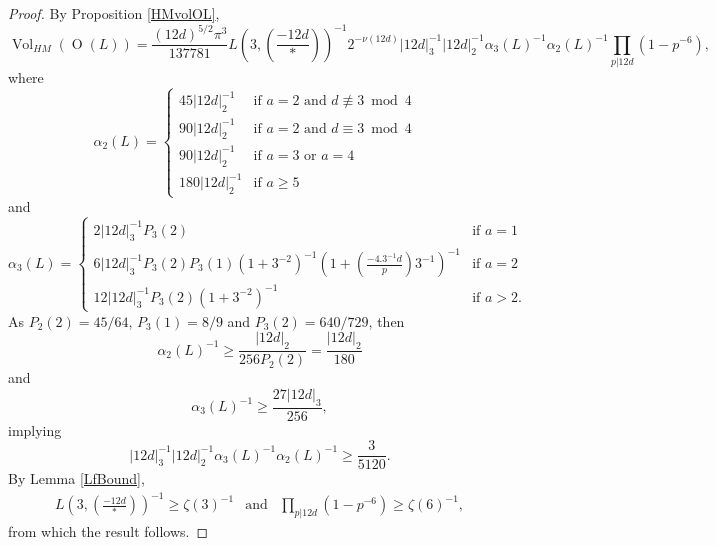 \documentclass[12pt, a4paper]{article}
\newcommand{\opn}{\operatorname}
\begin{document}
\begin{proof}
  By Proposition \ref{HMvolOL},
  \[
  \opn{Vol}_{HM}(\opn{O}(L)) = 
    \frac{(12d)^{5/2} \pi^3}{137781}
    L \left (3, \left ( \frac{-12d}{*} \right ) \right )^{-1}
    2^{-\nu(12d)}  \vert 12d \vert^{-1}_3 \vert 12d \vert^{-1}_2 \alpha_3(L)^{-1} \alpha_2(L)^{-1}
    \prod_{p \vert 12d} (1-p^{-6}),   
  \]
  where
  \begin{equation*}
    \alpha_2(L) =
    \begin{cases}
      45 \vert 12 d \vert_2^{-1} 
      & \text{if $a=2$ and $d \not \equiv 3 \bmod{ 4}$ } \\
      90 \vert 12 d \vert_2^{-1} 
      & \text{if $a=2$ and $d \equiv 3 \bmod{ 4}$} \\
      90 \vert 12 d \vert_2^{-1} 
      & \text{if $a=3$ or $a=4$} \\
      180 \vert 12 d \vert_2^{-1} 
      & \text{if $a \geq 5$}
    \end{cases}
  \end{equation*}
  and
  \begin{equation*}
    \alpha_3(L) =
    \begin{cases}
      2 \vert 12 d \vert_3^{-1} P_3(2) & \text{if $a=1$} \\
      6 \vert 12 d \vert_3^{-1} P_3(2) P_3(1) (1+3^{-2})^{-1} ( 1 + \left ( \frac{-4.3^{-1} d}{p} \right ) 3^{-1})^{-1} &
      \text{if $a=2$} \\
      12 \vert 12 d \vert_3^{-1} P_3(2) (1+3^{-2})^{-1} & \text{if $a>2$}.
    \end{cases}
  \end{equation*}
  As $P_2(2) = 45/64$, $P_3(1) = 8/9$ and $P_3(2) = 640/729$, then  
  \begin{equation*}
    \alpha_2(L)^{-1} \geq \frac{\vert 12 d \vert_2}{256 P_2(2)} = \frac{\vert 12 d \vert_2}{180}
  \end{equation*}
  and
  \begin{equation*}
    \alpha_3(L)^{-1} \geq \frac{27 \vert 12 d \vert_3}{256}, 
  \end{equation*}
  implying 
  \begin{equation*}
    \vert 12d \vert_3^{-1} \vert 12d \vert_2^{-1} \alpha_3(L)^{-1} \alpha_2(L)^{-1} \geq \frac{3}{5120}.
  \end{equation*}
  By Lemma \ref{LfBound},
  \begin{equation*}
    \begin{array}{ccc}
      L(3, \left( \frac{-12d}{*} \right ) )^{-1} \geq \zeta(3)^{-1}
      & \text{and}
      & \prod_{p \vert 12d} (1-p^{-6}) \geq \zeta(6)^{-1},
    \end{array}
  \end{equation*}
  from which the result follows.
\end{proof}
\end{document}
